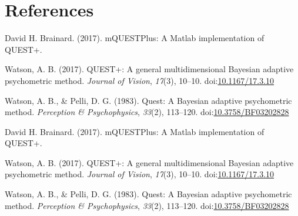 \documentclass[
  man,floatsintext]{apa6}
\newlength{\cslhangindent}
\newenvironment{cslreferences}%
  {\setlength{\parindent}{0pt}%
  \everypar{\setlength{\hangindent}{\cslhangindent}}\ignorespaces}%
  {\par}
\begin{document}
\newpage

\hypertarget{references}{%
\section{References}\label{references}}

\begingroup
\setlength{\parindent}{-0.5in}
\setlength{\leftskip}{0.5in}

\hypertarget{refs}{}
\begin{cslreferences}
\leavevmode\hypertarget{ref-davidh.brainardMQUESTPlusMatlabImplementation2017}{}%
David H. Brainard. (2017). mQUESTPlus: A Matlab implementation of QUEST+.

\leavevmode\hypertarget{ref-watsonQUESTGeneralMultidimensional2017}{}%
Watson, A. B. (2017). QUEST+: A general multidimensional Bayesian adaptive psychometric method. \emph{Journal of Vision}, \emph{17}(3), 10--10. doi:\href{https://doi.org/10.1167/17.3.10}{10.1167/17.3.10}

\leavevmode\hypertarget{ref-watsonQuestBayesianAdaptive1983}{}%
Watson, A. B., \& Pelli, D. G. (1983). Quest: A Bayesian adaptive psychometric method. \emph{Perception \& Psychophysics}, \emph{33}(2), 113--120. doi:\href{https://doi.org/10.3758/BF03202828}{10.3758/BF03202828}

\leavevmode\hypertarget{ref-davidh.brainardMQUESTPlusMatlabImplementation2017}{}%
David H. Brainard. (2017). mQUESTPlus: A Matlab implementation of QUEST+.

\leavevmode\hypertarget{ref-watsonQUESTGeneralMultidimensional2017}{}%
Watson, A. B. (2017). QUEST+: A general multidimensional Bayesian adaptive psychometric method. \emph{Journal of Vision}, \emph{17}(3), 10--10. doi:\href{https://doi.org/10.1167/17.3.10}{10.1167/17.3.10}

\leavevmode\hypertarget{ref-watsonQuestBayesianAdaptive1983}{}%
Watson, A. B., \& Pelli, D. G. (1983). Quest: A Bayesian adaptive psychometric method. \emph{Perception \& Psychophysics}, \emph{33}(2), 113--120. doi:\href{https://doi.org/10.3758/BF03202828}{10.3758/BF03202828}
\end{cslreferences}

\endgroup
\end{document}
